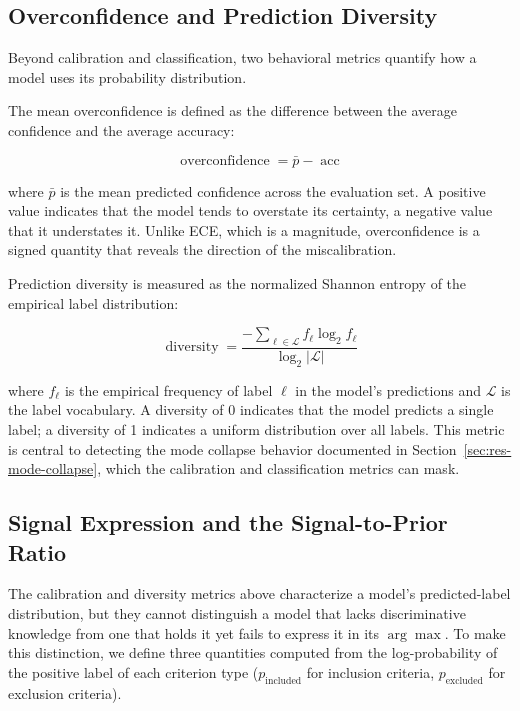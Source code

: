 \subsection{Overconfidence and Prediction Diversity}
\label{subsec:met-behavioral}

Beyond calibration and classification, two behavioral metrics quantify 
how a model uses its probability distribution.

The mean overconfidence is defined as the difference between the average 
confidence and the average accuracy:

\begin{equation}
    \operatorname{overconfidence} = \bar{p} - \operatorname{acc}
    \label{eq:overconf}
\end{equation}

where $\bar{p}$ is the mean predicted confidence across the evaluation 
set. A positive value indicates that the model tends to overstate its 
certainty, a negative value that it understates it. Unlike ECE, which is 
a magnitude, overconfidence is a signed quantity that reveals the 
direction of the miscalibration.

Prediction diversity is measured as the normalized Shannon entropy of 
the empirical label distribution:

\begin{equation}
    \operatorname{diversity} = 
    \frac{
        -\sum_{\ell \in \mathcal{L}} f_\ell \log_2 f_\ell
    }{
        \log_2 |\mathcal{L}|
    }
    \label{eq:diversity}
\end{equation}

where $f_\ell$ is the empirical frequency of label $\ell$ in the model's 
predictions and $\mathcal{L}$ is the label vocabulary. A diversity of 0 
indicates that the model predicts a single label; a diversity of 1 
indicates a uniform distribution over all labels. This metric is central 
to detecting the mode collapse behavior documented in 
Section~\ref{sec:res-mode-collapse}, which the calibration and 
classification metrics can mask.

\subsection{Signal Expression and the Signal-to-Prior Ratio}
\label{subsec:met-signal-prior}

The calibration and diversity metrics above characterize a model's 
predicted-label distribution, but they cannot distinguish a model that 
lacks discriminative knowledge from one that holds it yet fails to 
express it in its $\arg\max$. To make this distinction, we define three 
quantities computed from the log-probability of the positive label of 
each criterion type ($p_{\text{included}}$ for inclusion criteria, 
$p_{\text{excluded}}$ for exclusion criteria).

